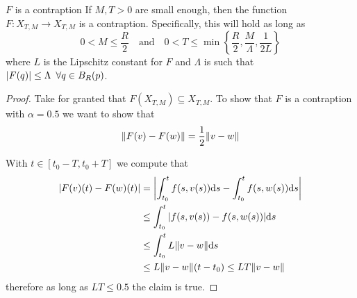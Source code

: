 \documentclass[12pt]{extarticle}
\numberwithin{equation}{section}
\begin{document}
\begin{proposition}{$F$ is a contraption}{}
	If $M, T > 0$ are small enough, then the function $F: X_{T, M} \to X_{T, M}$
	is a contraption.
	Specifically, this will hold as long as
	\begin{equation}
		0 < M \leq \frac{R}{2} \quad \text{and} \quad 0 < T \leq \min \left\{ \frac{R}{2}, \frac{M}{\Lambda}, \frac{1}{2L} \right\}
	\end{equation}
	where $L$ is the Lipschitz constant for $F$ and
	$\Lambda$ is such that $\abs{F(q)} \leq \Lambda \enspace \forall q \in B_R(p)$.
\end{proposition}

\begin{proof}
	Take for granted that $F(X_{T, M}) \subseteq X_{T, M}$.
	To show that $F$ is a contraption with $\alpha = 0.5$ we want to show that
	\begin{equation}
		\norm{F(v) - F(w)} = \frac{1}{2} \norm{v-w}
	\end{equation}

	With $t \in [t_0 - T, t_0 + T]$ we compute that
	\begin{align}
		\abs{F(v)(t) - F(w)(t)} & = \abs{\int_{t_0}^{t} f(s,v(s)) \dd s - \int_{t_0}^{t} f(s,w(s)) \dd s} \\
		                        & \leq \int_{t_0}^{t} \abs{f(s,v(s)) - f(s,w(s))} \dd s                   \\
		                        & \leq \int_{t_0}^{t} L\norm{v - w} \dd s                                 \\
		                        & \leq L \norm{v - w} (t - t_0) \leq LT \norm{v - w}
	\end{align}
	therefore as long as $LT \leq 0.5$ the claim is true.
\end{proof}
\end{document}
